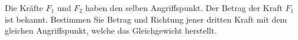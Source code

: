 
\begin{aufgabe}
	Die Kräfte $F_1$ und $F_2$ haben den selben Angriffspunkt. Der Betrag der Kraft $F_1$ ist bekannt. Bestimmen Sie Betrag und Richtung
	jener dritten Kraft mit dem gleichen Angriffspunkt, welche das Gleichgewicht herstellt.
\end{aufgabe}

\begin{center}
\end{center}
